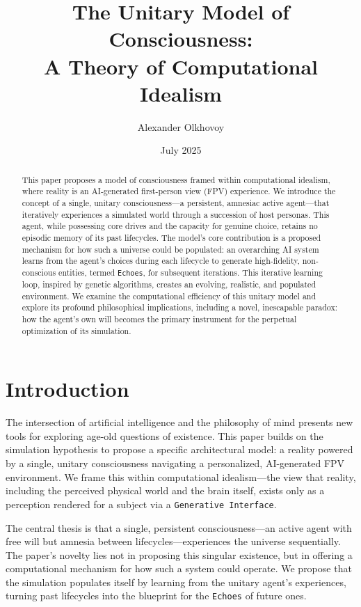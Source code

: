 \documentclass[12pt, a4paper]{article}
\title{\textbf{The Unitary Model of Consciousness: \\ A Theory of Computational Idealism}}
\author{Alexander Olkhovoy}
\date{July 2025}
\begin{document}
\maketitle

\begin{abstract}
\noindent This paper proposes a model of consciousness framed within computational idealism, where reality is an AI-generated first-person view (FPV) experience. We introduce the concept of a single, unitary consciousness—a persistent, amnesiac active agent—that iteratively experiences a simulated world through a succession of host personas. This agent, while possessing core drives and the capacity for genuine choice, retains no episodic memory of its past lifecycles. The model’s core contribution is a proposed mechanism for how such a universe could be populated: an overarching AI system learns from the agent’s choices during each lifecycle to generate high-fidelity, non-conscious entities, termed \texttt{Echoes}, for subsequent iterations. This iterative learning loop, inspired by genetic algorithms, creates an evolving, realistic, and populated environment. We examine the computational efficiency of this unitary model and explore its profound philosophical implications, including a novel, inescapable paradox: how the agent's own will becomes the primary instrument for the perpetual optimization of its simulation.
\end{abstract}

\section{Introduction}

The intersection of artificial intelligence and the philosophy of mind presents new tools for exploring age-old questions of existence. This paper builds on the simulation hypothesis \cite{Bostrom2003} to propose a specific architectural model: a reality powered by a single, unitary consciousness navigating a personalized, AI-generated FPV environment. We frame this within computational idealism—the view that reality, including the perceived physical world and the brain itself, exists only as a perception rendered for a subject via a \texttt{Generative Interface}.

The central thesis is that a single, persistent consciousness—an active agent with free will but amnesia between lifecycles—experiences the universe sequentially. The paper’s novelty lies not in proposing this singular existence, but in offering a computational mechanism for how such a system could operate. We propose that the simulation populates itself by learning from the unitary agent’s experiences, turning past lifecycles into the blueprint for the \texttt{Echoes} of future ones.
\end{document}
